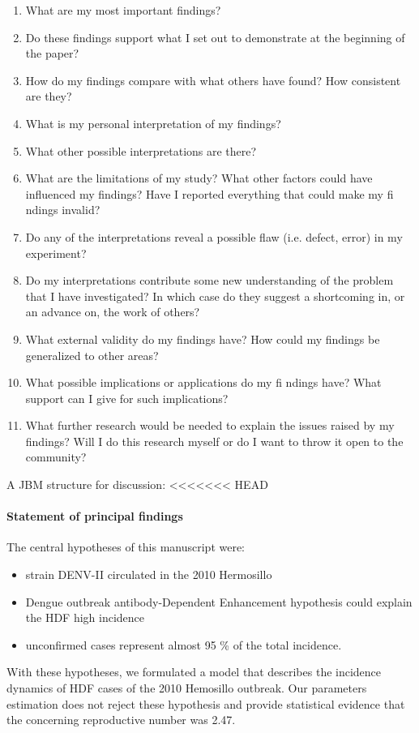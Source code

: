 \begin{enumerate}
    \item
        What are my most important findings?
    \item
        Do these findings support what I set out to demonstrate at the beginning of the
        paper?
    \item
        How do my findings compare with what others have found? How consistent are
        they?
    \item
        What is my personal interpretation of my findings?
    \item
        What other possible interpretations are there?
    \item
        What are the limitations of my study? What other factors could have influenced
        my findings? Have I reported everything that could make my fi ndings invalid?
    \item
        Do any of the interpretations reveal a possible flaw (i.e. defect, error) in my
        experiment?
    \item
        Do my interpretations contribute some new understanding of the problem that I
        have investigated? In which case do they suggest a shortcoming in, or an
        advance on, the work of others?
    \item
        What external validity do my findings have? How could my findings be 
        generalized to other areas?
    \item
        What possible implications or applications do my fi ndings have? What support
        can I give for such implications?
    \item
        What further research would be needed to explain the issues raised by my 
        findings? Will I do this research myself or do I want to throw it open to the
        community?
\end{enumerate}
A JBM structure for discussion:
<<<<<<< HEAD
    \paragraph{Statement of principal findings}
        The central hypotheses of this manuscript were:
        \begin{itemize}
            \item
                strain DENV-II circulated in the 2010 Hermosillo 
            \item
                Dengue outbreak antibody-Dependent Enhancement hypothesis
                could explain the HDF high incidence 
            \item
                unconfirmed cases represent almost 95 \% of the total
                incidence.
        \end{itemize}
    With these hypotheses, we formulated a model that describes
    the incidence dynamics of HDF cases of the 2010 Hemosillo outbreak.
    Our parameters estimation does not reject these hypothesis and provide
    statistical evidence that the concerning reproductive number was 2.47.
    
